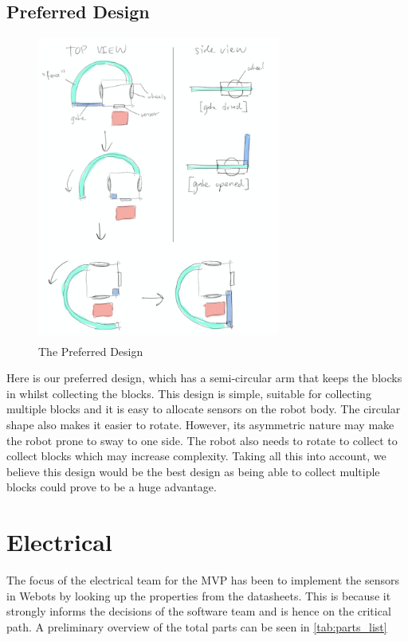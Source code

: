 \subsection{Preferred Design}


\begin{figure}[H]
    \centering
    \includegraphics[width=8cm]{Design3}
    \caption{The Preferred Design}
\end{figure}


Here is our preferred design, which has a semi-circular arm that keeps the blocks in whilst collecting the blocks. This design is simple, suitable for collecting multiple blocks and it is easy to allocate sensors on the robot body. The circular shape also makes it easier to rotate. However, its asymmetric nature may make the robot prone to sway to one side. The robot also needs to rotate to collect to collect blocks which may increase complexity. Taking all this into account, we believe this design would be the best design as being able to collect multiple blocks could prove to be a huge advantage.









\section{Electrical}

The focus of the electrical team for the MVP has been to implement the sensors in Webots by looking up the properties from the datasheets. This is because it strongly informs the decisions of the software team and is hence on the critical path. A preliminary overview of the total parts can be seen in \cref{tab:parts_list}


